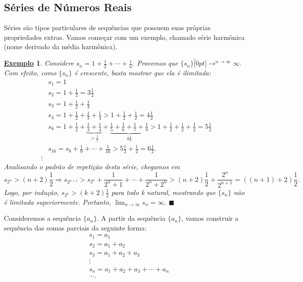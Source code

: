\documentclass{article}
\newtheorem{example}{\underline{Exemplo}}
\renewcommand\qedsymbol{$\blacksquare$}
\begin{document}
\subsection{S\'eries de N\'umeros Reais}
  S\'eries s\~ao tipos particulares de sequ\^encias que possuem suas pr\'oprias propriedades extras. Vamos come\c car com um exemplo, chamado s\'erie harm\^onica (nome derivado da m\'edia harm\^onica).
 \begin{example}
   Considere $s_{n} = 1 + \frac{1}{2} + \cdots + \frac{1}{n}.$ Provemos que $\{s_{n}\}\overbracket[0pt]{\longrightarrow}^{n\to \infty}\infty.$
   Com efeito, como $\{s_{n}\} $ \'e crescente, basta mostrar que ela \'e ilimitada: 
  \begin{align*}
    &s_{1} = 1\\
    &s_{2} = 1 + \frac{1}{2} = 3\frac{1}{2}\\
    &s_{3} = 1 + \frac{1}{2} + \frac{1}{3}\\
    &s_{4} = 1 + \frac{1}{2} + \frac{1}{3} + \frac{1}{4} > 1 + \frac{1}{2} + \frac{1}{2} = 4\frac{1}{2}\\
    &s_{8} = 1 + \frac{1}{2} + \underbrace{\frac{1}{3} + \frac{1}{4}}_{> \frac{1}{2}} + \underbrace{\frac{1}{5} + \frac{1}{6} + \frac{1}{7} + \frac{1}{8}}_{4\frac{1}{8}} > 1 + \frac{1}{2} + \frac{1}{2} + \frac{1}{2} = 5\frac{1}{2}\\
    &s_{16} = s_{8} + \frac{1}{9} +\cdots + \frac{1}{16} > 5\frac{1}{2} + \frac{1}{2} = 6\frac{1}{2}.\\
    \vdots
  \end{align*}
  Analisando o padr\~ao de repeti\c c\~ao desta s\'erie, chegamos em 
    $$
      s_{2^{n}} > (n+2)\frac{1}{2} \Rightarrow s_{2^{n+1}} > s_{2^n} + \frac{1}{2^{n}+1} + \cdots + \frac{1}{2^{n}+ 2^{n}} > (n+2)\frac{1}{2} + \frac{2^{n}}{2^{n+1}} = ((n+1)+2)\frac{1}{2}.
    $$
    Logo, por indu\c c\~ao, $s_{2^{k}} > (k+2)\frac{1}{2}$ para todo k natural, mostrando que $\{s_{n}\} $ n\~ao \'e limitada superiormente.
  Portanto, $\lim_{n\to\infty}s_{n} = \infty.$ \qedsymbol
 \end{example}
 Consideremos a sequ\^encia $\{a_{n}\}$. A partir da sequ\^encia $\{a_{n}\} $, vamos construir a sequ\^encia das somas parciais da seguinte forma: 
\begin{align*}
  &s_{1} = a_{1}\\
  &s_{2} = a_{1} + a_{2}\\
  &s_{3} = a_{1} + a_{2} + a_{3}\\
  &\vdots\\
  &s_{n} = a_{1} + a_{2} + a_{3} + \cdots + a_{n}\\
  &\cdots.
\end{align*}
\end{document}
